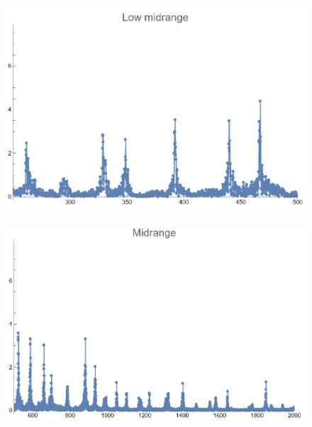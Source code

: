 \documentclass[12pt, letterpaper]{article}
\begin{document}
\begin{figure}[H]
  \centering
  \begin{minipage}{.5\textwidth}
    \centering
    \includegraphics[width=.9\linewidth]{imgs/Cancion7/lowmid.png}
    \label{fig:07d}
  \end{minipage}%
  \begin{minipage}{.5\textwidth}
    \centering
    \includegraphics[width=.9\linewidth]{imgs/Cancion7/mid.png}
    \label{fig:07e}
  \end{minipage}
\end{figure}
\end{document}
